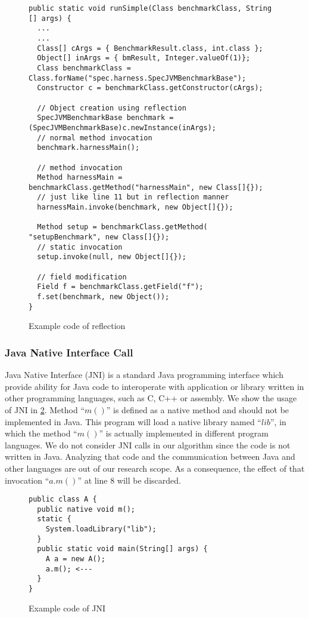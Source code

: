 \documentclass{fac}
\begin{document}
\begin{figure}
\begin{lstlisting}
public static void runSimple(Class benchmarkClass, String [] args) {
  ...
  ...
  Class[] cArgs = { BenchmarkResult.class, int.class };
  Object[] inArgs = { bmResult, Integer.valueOf(1)};
  Class benchmarkClass = Class.forName("spec.harness.SpecJVMBenchmarkBase");
  Constructor c = benchmarkClass.getConstructor(cArgs);

  // Object creation using reflection
  SpecJVMBenchmarkBase benchmark = (SpecJVMBenchmarkBase)c.newInstance(inArgs);
  // normal method invocation
  benchmark.harnessMain();
  
  // method invocation
  Method harnessMain = benchmarkClass.getMethod("harnessMain", new Class[]{});
  // just like line 11 but in reflection manner
  harnessMain.invoke(benchmark, new Object[]{}); 
  
  Method setup = benchmarkClass.getMethod( "setupBenchmark", new Class[]{});
  // static invocation
  setup.invoke(null, new Object[]{});
  
  // field modification
  Field f = benchmarkClass.getField("f");
  f.set(benchmark, new Object());
}
\end{lstlisting}
\caption{Example code of reflection}
\label{fig:reflection}
\end{figure}

\subsubsection{Java Native Interface Call}\label{subsubsec:jni-call}
Java Native Interface (JNI) is a standard Java programming interface which provide ability for Java code to interoperate with application or library written in other programming languages, such as C, C++ or assembly. We show the usage of JNI in \ref{fig:jni}. Method ``$m()$'' is defined as a native method and should not be implemented in Java. This program will load a native library named ``$lib$'', in which the method ``$m()$'' is actually implemented in different program languages. We do not consider JNI calls in our algorithm since the code is not written in Java. Analyzing that code and the communication between Java and other languages are out of our research scope. As a consequence, the effect of that invocation ``$a.m()$'' at line 8 will be discarded.
\begin{figure}
\begin{lstlisting}
public class A {
  public native void m();
  static {
    System.loadLibrary("lib");
  }
  public static void main(String[] args) {
    A a = new A();
    a.m(); <---
  }
}
\end{lstlisting}
\caption{Example code of JNI}
\label{fig:jni}
\end{figure}
\end{document}

